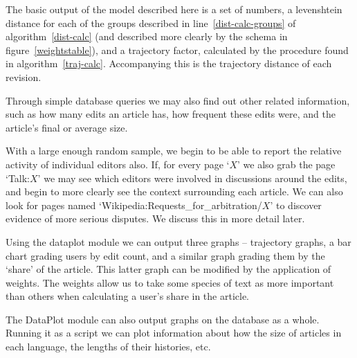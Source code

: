The basic output of the model described here is a set of numbers, a
levenshtein distance for each of the groups described in
line~\ref{dist-calc-groups} of algorithm~\ref{dist-calc} (and
described more clearly by the schema in figure~\ref{weightstable}),
and a trajectory factor, calculated by the procedure found in
algorithm~\ref{traj-calc}. Accompanying this is the trajectory
distance of each revision.

Through simple database queries we may also find out other related
information, such as how many edits an article has, how frequent these
edits were, and the article's final or average size.

With a large enough random sample, we begin to be able to report the
relative activity of individual editors also. If, for every page `$X$'
we also grab the page `Talk:$X$' we may see which editors were
involved in discussions around the edits, and begin to more clearly
see the context surrounding each article. We can also look for pages
named `Wikipedia:Requests\_for\_arbitration/$X$' to discover
evidence of more serious disputes. We discuss this in more detail
later.

Using the dataplot module we can output three graphs -- trajectory
graphs, a bar chart grading users by edit count, and a similar graph
grading them by the `share' of the article. This latter graph can be
modified by the application of weights. The weights allow us to take
some species of text as more important than others when calculating a
user's share in the article.

The DataPlot module can also output graphs on the database as a
whole. Running it as a script we can plot information about how the
size of articles in each language, the lengths of their histories,
etc. 
